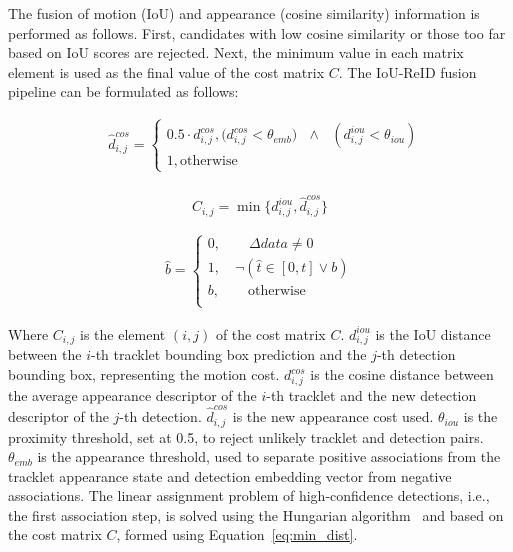 The fusion of motion (IoU) and appearance (cosine similarity) information is performed as follows. First, candidates with low cosine similarity or those too far based on IoU scores are rejected. Next, the minimum value in each matrix element is used as the final value of the cost matrix $C$. The IoU-ReID fusion pipeline can be formulated as follows:

\begin{equation}
  \begin{aligned}
  & \hat{d}_{i, j}^{cos} = 
    \begin{cases}
      0.5 \cdot d_{i, j}^{cos}, \text{($d_{i, j}^{cos} < \theta_{emb})$ $\land$ $(d_{i, j}^{iou} < \theta_{iou})$}\\
      1, \text{otherwise}
    \end{cases} \\
  \end{aligned}
  \label{eq:min_dist}        
\end{equation}

\begin{equation}
  C_{i, j} = \min\{d_{i, j}^{iou}, \hat{d}_{i, j}^{cos}\}
\end{equation}

\begin{equation}
  \begin{aligned}
  \hat{b} = 
    \begin{cases}
      0, \quad\quad \Delta data \neq 0 \\
      1, \quad \neg ( \hat{t} \in [0, t] \lor b ) \\
      b, \quad\quad \text{otherwise}\\
    \end{cases}
  \end{aligned}
\end{equation}
  
Where $C_{i, j}$ is the element $(i, j)$ of the cost matrix $C$. $d_{i, j}^{iou}$ is the IoU distance between the $i$-th tracklet bounding box prediction and the $j$-th detection bounding box, representing the motion cost. $d_{i, j}^{cos}$ is the cosine distance between the average appearance descriptor of the $i$-th tracklet and the new detection descriptor of the $j$-th detection. $\hat{d}_{i, j}^{cos}$ is the new appearance cost used. $\theta_{iou}$ is the proximity threshold, set at 0.5, to reject unlikely tracklet and detection pairs. $\theta_{emb}$ is the appearance threshold, used to separate positive associations from the tracklet appearance state and detection embedding vector from negative associations.
The linear assignment problem of high-confidence detections, i.e., the first association step, is solved using the Hungarian algorithm~\cite{kuhn1955hungarian} and based on the cost matrix $C$, formed using Equation~\ref{eq:min_dist}.

